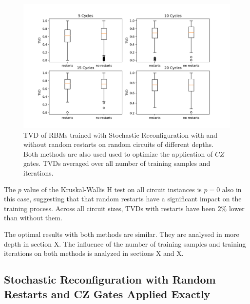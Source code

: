 \begin{figure}[H]
  \centering
  \includegraphics[width=\textwidth]{figures/sr_restarts.png}
  \caption[Comparison of Stochastic Reconfiguration with and without random restarts]{TVD of RBMs trained with 
  Stochastic Reconfiguration with and without random restarts on random circuits of different depths. Both methods are also used  
  used to optimize the application of $CZ$ gates. TVDs averaged over all number of training samples 
  and iterations.}
  \label{fig:sr_restarts}
\end{figure}


The $p$ value of the Kruskal-Wallis H test on all circuit instances is $p=0$ also in this case, suggesting that 
that random restarts have a significant impact on the training process. Across all circuit sizes, TVDs with restarts have been $2\%$ lower than without them. 


The optimal results with both methods are similar. They are analysed in more depth in section X.
The influence of the number of training samples and training iterations on both methods is analyzed in 
sections X and X.
\fi
\subsection{Stochastic Reconfiguration with Random Restarts and CZ Gates Applied Exactly}

